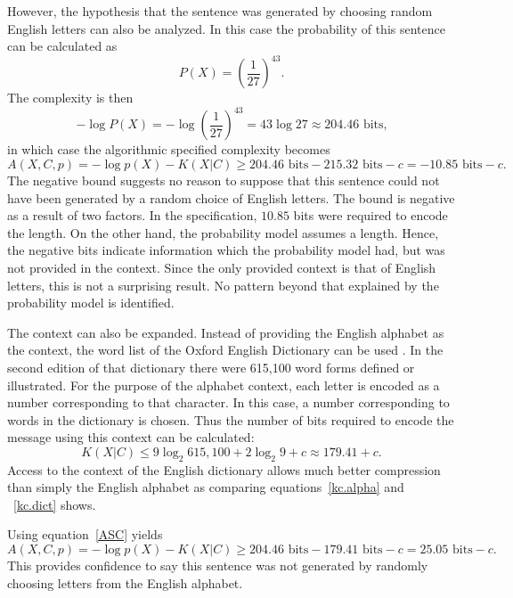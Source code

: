 However, the hypothesis that the sentence was generated by choosing random English letters can also be analyzed.
In this case the probability of this sentence can be calculated as
\begin{equation}
    P(X) = \left(\frac{1}{27}\right)^{43} \mbox{.}
\end{equation}
The complexity is then
\begin{equation}
    -\log P(X) = -\log \left(\frac{1}{27}\right)^{43} = 43 \log 27 \approx 204.46 \mbox{ bits,}
\end{equation}
in which case the algorithmic specified complexity becomes
\begin{equation}
    A(X,C,p) = - \log p(X) - K(X|C) \geq 204.46 \mbox{ bits} - 215.32 \mbox{ bits} - c = -10.85 \mbox{ bits} - c \mbox{.}
\end{equation}
The negative bound suggests no reason to suppose that this sentence could not have been generated by a random choice of English letters.
The bound is negative as a result of two factors.
In the specification, $10.85$ bits were required to encode the length.
On the other hand, the probability model assumes a length.
Hence, the negative bits indicate information which the probability model had, but was not provided in the context.
Since the only provided context is that of English letters, this is not a surprising result.
No pattern beyond that explained by the probability model is identified.

The context can also be expanded.
Instead of providing the English alphabet as the context, the word list of the Oxford English Dictionary can be used \citep{Oxford2012}.
In the second edition of that dictionary there were 615,100 word forms defined or illustrated.
For the purpose of the alphabet context, each letter is encoded as a number corresponding to that character.
In this case, a number corresponding to words in the dictionary is chosen.
Thus the number of bits required to encode the message using this context can be calculated:
\begin{equation}
    \label{kc.dict}
    K(X|C) \leq 9 \log_2  615,100 + 2 \log_2 9 + c \approx 179.41 + c \mbox{.}
\end{equation}
Access to the context of the English dictionary allows much better compression than simply the English alphabet as comparing equations~\ref{kc.alpha} and ~\ref{kc.dict} shows.

Using equation~\ref{ASC} yields
\begin{equation}
    A(X,C,p) = - \log p(X) - K(X|C) \geq 204.46 \mbox{ bits} - 179.41 \mbox{ bits} - c = 25.05 \mbox{ bits} - c \mbox{.}
\end{equation}
This provides confidence to say this sentence was not generated by randomly choosing letters from the English alphabet.

